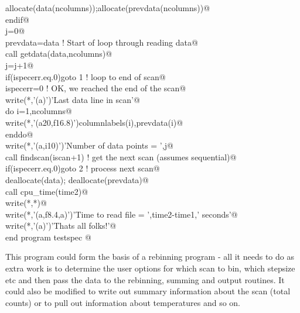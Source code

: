 \documentclass[10pt,a4paper,notitlepage]{article}
\begin{document}
\begin{flushleft}
\begin{minipage}{\linewidth}
\begin{list}{}{}
\mbox{}\verb@        allocate(data(ncolumns));allocate(prevdata(ncolumns))@\\
\mbox{}\verb@      endif@\\
\mbox{}\verb@      j=0@\\
\mbox{}     prevdata=data                  ! Start of loop through reading data@\\
\mbox{}\verb@      call getdata(data,ncolumns)@\\
\mbox{}\verb@      j=j+1@\\
\mbox{}\verb@      if(ispecerr.eq.0)goto 1                       ! loop to end of scan@\\
\mbox{}\verb@      ispecerr=0                     ! OK, we reached the end of the scan@\\
\mbox{}\verb@      write(*,'(a)')'Last data line in scan'@\\
\mbox{}\verb@      do i=1,ncolumns@\\
\mbox{}\verb@        write(*,'(a20,f16.8)')columnlabels(i),prevdata(i)@\\
\mbox{}\verb@      enddo@\\
\mbox{}\verb@      write(*,'(a,i10)')'Number of data points = ',j@\\
\mbox{}\verb@      call findscan(iscan+1)     ! get the next scan (assumes sequential)@\\
\mbox{}\verb@      if(ispecerr.eq.0)goto 2                         ! process next scan@\\
\mbox{}\verb@      deallocate(data); deallocate(prevdata)@\\
\mbox{}\verb@      call cpu_time(time2)@\\
\mbox{}\verb@      write(*,*)@\\
\mbox{}\verb@      write(*,'(a,f8.4,a)')'Time to read file = ',time2-time1,' seconds'@\\
\mbox{}\verb@      write(*,'(a)')'Thats all folks!'@\\
\mbox{}\verb@      end program testspec                                                   @{\NWsep}
\end{list}
\vspace{-1.5ex}
\footnotesize
\begin{list}{}{\setlength{\itemsep}{-\parsep}\setlength{\itemindent}{-\leftmargin}}

\item{}
\end{list}
\end{minipage}\vspace{4ex}
\end{flushleft}
This program could form the basis of a rebinning program - all it needs to do 
as extra work is to determine the user options for which scan to bin, which 
stepsize etc and then pass the data to the rebinning, summing and output 
routines. 
It could also be modified to write out summary information about the scan 
(total counts) or to pull out information about temperatures and so on.
\end{document}

